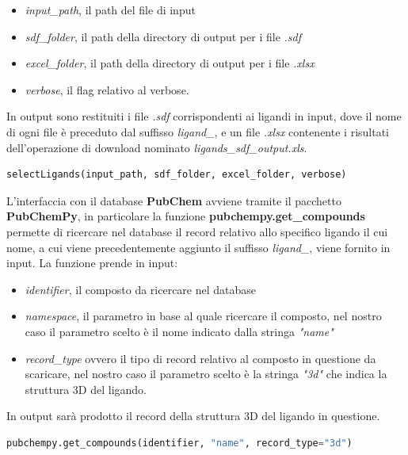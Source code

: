 \begin{itemize}
    \item \textit{input\_path}, il path del file di input
    \item \textit{sdf\_folder}, il path della directory di output per i file \textit{.sdf}
    \item \textit{excel\_folder}, il path della directory di output per i file \textit{.xlsx}
    \item \textit{verbose}, il flag relativo al verbose.
\end{itemize}

In output sono restituiti i file \textit{.sdf} corrispondenti ai ligandi in input, dove il nome di ogni file è preceduto dal suffisso \textit{ligand\_}, e un file \textit{.xlsx} contenente i risultati dell'operazione di download nominato \textit{ligands\_sdf\_output.xls}.

\begin{lstlisting}[language=Python, label=lst:code4, caption={funzione selectLigands}]
selectLigands(input_path, sdf_folder, excel_folder, verbose)
\end{lstlisting}

L'interfaccia con il database \textbf{PubChem} avviene tramite il pacchetto \textbf{PubChemPy}, in particolare la funzione \textbf{pubchempy.get\_compounds} permette di ricercare nel database il record relativo allo specifico ligando il cui nome, a cui viene precedentemente aggiunto il suffisso \textit{ligand\_}, viene fornito in input. La funzione prende in input:

\begin{itemize}
    \item \textit{identifier}, il composto da ricercare nel database
    \item \textit{namespace}, il parametro in base al quale ricercare il composto, nel nostro caso il parametro scelto è il nome indicato dalla stringa \textit{"name"}
    \item \textit{record\_type} ovvero il tipo di record relativo al composto in questione da scaricare, 
    nel nostro caso il parametro scelto è la stringa \textit{"3d"} che indica la struttura 3D del ligando.
\end{itemize}

In output sarà prodotto il record della struttura 3D del ligando in questione.

\begin{lstlisting}[language=Python, label=lst:code5, caption={funzione pubchempy.get\_compounds}]
pubchempy.get_compounds(identifier, "name", record_type="3d")
\end{lstlisting}

